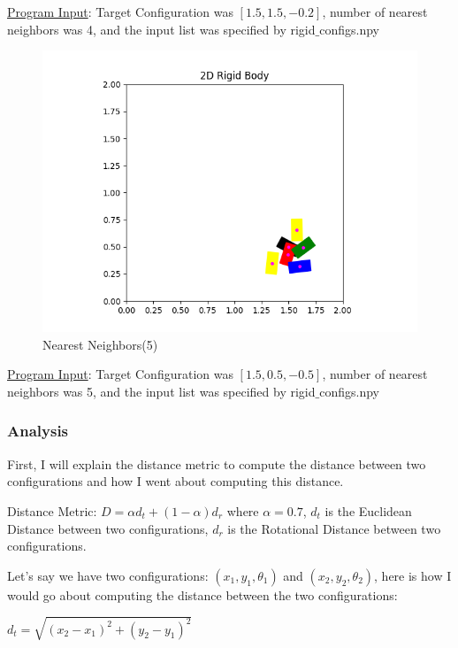 \documentclass{article}
\begin{document}
\underline{Program Input}: Target Configuration was $[1.5, 1.5, -0.2]$, number of nearest neighbors was 4, and the input list was specified by rigid$\_$configs.npy

\newpage
\begin{figure}[h!]
	\includegraphics[width= 0.9 \linewidth]{P2_NearestNeighbor(5).png}
	\centering
	\caption{Nearest Neighbors(5)}
	\label{P2_NearestNeighbor(5).png}
\end{figure}

\underline{Program Input}: Target Configuration was $[1.5, 0.5, -0.5]$, number of nearest neighbors was 5, and the input list was specified by rigid$\_$configs.npy

\subsubsection{Analysis}
First, I will explain the distance metric to compute the distance between two configurations and how I went about computing this distance.  \newline 

Distance Metric: $D = \alpha d_t + (1 - \alpha) d_r$ \newline 
where $\alpha = 0.7$, $d_t$ is the Euclidean Distance between two configurations, $d_r$ is the Rotational Distance between two configurations. 

Let's say we have two configurations: $(x_1, y_1, \theta_1)$ and $(x_2, y_2, \theta_2)$, here is how I would go about computing the distance between the two configurations: \newline 

$d_t = \sqrt{(x_2 - x_1)^2 + (y_2 - y_1)^2}$ \newline 
\end{document}

